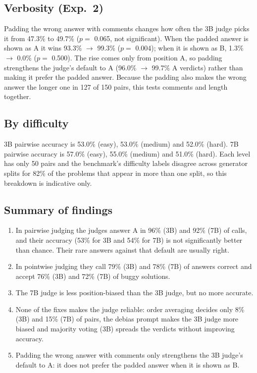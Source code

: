 \subsection{Verbosity (Exp.~2)}

Padding the wrong answer with comments changes how often the 3B judge picks it from 47.3\% to 49.7\% ($p=$ 0.065, not significant). When the padded answer is shown as A it wins 93.3\% $\rightarrow$ 99.3\% ($p=$ 0.004); when it is shown as B, 1.3\% $\rightarrow$ 0.0\% ($p=$ 0.500). The rise comes only from position A, so padding strengthens the judge's default to A (96.0\% $\rightarrow$ 99.7\% A verdicts) rather than making it prefer the padded answer. Because the padding also makes the wrong answer the longer one in 127 of 150 pairs, this tests comments and length together.

\subsection{By difficulty}
3B pairwise accuracy is 53.0\% (easy), 53.0\% (medium) and 52.0\% (hard). 7B pairwise accuracy is 57.0\% (easy), 55.0\% (medium) and 51.0\% (hard). Each level has only 50 pairs and the benchmark's difficulty labels disagree across generator splits for 82\% of the problems that appear in more than one split, so this breakdown is indicative only.

\subsection{Summary of findings}
\begin{enumerate}
\item In pairwise judging the judges answer A in 96\% (3B) and 92\% (7B) of calls, and their accuracy (53\% for 3B and 54\% for 7B) is not significantly better than chance. Their rare answers against that default are usually right.
\item In pointwise judging they call 79\% (3B) and 78\% (7B) of answers correct and accept 76\% (3B) and 72\% (7B) of buggy solutions.
\item The 7B judge is less position-biased than the 3B judge, but no more accurate.
\item None of the fixes makes the judge reliable: order averaging decides only 8\% (3B) and 15\% (7B) of pairs, the debias prompt makes the 3B judge more biased and majority voting (3B) spreads the verdicts without improving accuracy.
\item Padding the wrong answer with comments only strengthens the 3B judge's default to A: it does not prefer the padded answer when it is shown as B.
\end{enumerate}

